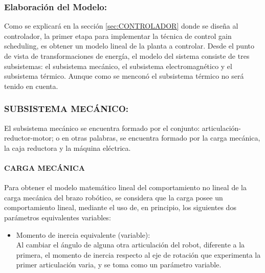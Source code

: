 \documentclass{article}
\begin{document}
\begin{sloppypar}
\subsubsection{Elaboración del Modelo:}
\label{sec:Elaboración del Modelo:}

Como se explicará en la sección \ref{sec:CONTROLADOR} donde se diseña al controlador, la primer etapa para implementar la técnica de control gain scheduling, es obtener un modelo lineal de la planta a controlar.
Desde el punto de vista de transformaciones de energía, el modelo del sistema consiste de tres subsistemas: el subsistema mecánico, el subsistema electromagnético y el subsistema térmico. Aunque como se menconó el subsistema térmico no será tenido en cuenta.

\subsubsection{SUBSISTEMA MECÁNICO:}
\label{sec:SUBSISTEMA MECÁNICO:}

El subsistema mecánico se encuentra formado por el conjunto: articulación-reductor-motor; o en otras palabras, se encuentra formado por la carga mecánica, la caja reductora y la máquina eléctrica.

\paragraph{\textbf{CARGA MECÁNICA}}
\label{sec:CARGA MECÁNICA}
\hfill

\hfill

Para obtener el modelo matemático lineal del comportamiento no lineal de la carga mecánica del brazo robótico, se considera que
la carga posee un comportamiento lineal, mediante el uso de, en principio, los siguientes dos parámetros equivalentes variables:
\begin{itemize}
    \item Momento de inercia equivalente (variable):
    \\ Al cambiar el ángulo de alguna otra articulación del robot, diferente a la primera, el momento de inercia respecto al eje de rotación que experimenta la primer articulación varia, y se toma como un parámetro variable.


\end{itemize}
\end{sloppypar}
\end{document}
